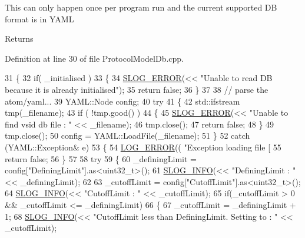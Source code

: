 This can only happen once per program run and the current supported D\-B format is in Y\-A\-M\-L

\begin{DoxyReturn}{Returns}

\end{DoxyReturn}


Definition at line 30 of file Protocol\-Model\-Db.\-cpp.


\begin{DoxyCode}
31 \{
32     \textcolor{keywordflow}{if}( \_initialised )
33     \{
34         \hyperlink{_logger_8h_a2a8694cd392d18f4db6b9cc9f15bafe3}{SLOG\_ERROR}(<< \textcolor{stringliteral}{"Unable to read DB because it is already initialised"});
35         \textcolor{keywordflow}{return} \textcolor{keyword}{false};
36     \}
37 
38     \textcolor{comment}{// parse the atom/yaml...}
39     YAML::Node config;
40     \textcolor{keywordflow}{try} 
41     \{
42         std::ifstream tmp(\_filename);
43         \textcolor{keywordflow}{if} ( !tmp.good() )
44         \{
45             \hyperlink{_logger_8h_a2a8694cd392d18f4db6b9cc9f15bafe3}{SLOG\_ERROR}(<< \textcolor{stringliteral}{"Unable to find vsid db file : "} << \_filename);
46             tmp.close();
47             \textcolor{keywordflow}{return} \textcolor{keyword}{false};
48         \}
49         tmp.close();
50         config = YAML::LoadFile(\_filename);
51     \} 
52     \textcolor{keywordflow}{catch} (YAML::Exception& e)
53     \{
54         \hyperlink{_logger_8h_aa2ffef3c03ca18789b5d04ac9b260128}{LOG\_ERROR}(( \textcolor{stringliteral}{"Exception loading file [%
55         \textcolor{keywordflow}{return} \textcolor{keyword}{false};
56     \}
57 
58     \textcolor{keywordflow}{try}
59     \{
60         \_definingLimit = config[\textcolor{stringliteral}{"DefiningLimit"}].as<uint32\_t>();
61         \hyperlink{_logger_8h_a119c1c29ba35a8db38e2358e41167282}{SLOG\_INFO}(<< \textcolor{stringliteral}{"DefiningLimit : "} << \_definingLimit);
62 
63         \_cutoffLimit = config[\textcolor{stringliteral}{"CutoffLimit"}].as<uint32\_t>();
64         \hyperlink{_logger_8h_a119c1c29ba35a8db38e2358e41167282}{SLOG\_INFO}(<< \textcolor{stringliteral}{"CutoffLimit : "} << \_cutoffLimit);
65         \textcolor{keywordflow}{if}(\_cutoffLimit > 0 && \_cutoffLimit <= \_definingLimit)
66         \{
67             \_cutoffLimit = \_definingLimit + 1;
68             \hyperlink{_logger_8h_a119c1c29ba35a8db38e2358e41167282}{SLOG\_INFO}(<< \textcolor{stringliteral}{"CutoffLimit less than DefiningLimit. Setting to : "} << \_cutoffLimit);
}
\end{DoxyCode}
